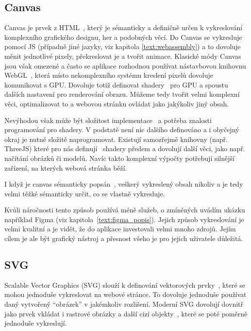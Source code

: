 \subsection{Canvas}

Canvas je prvek z HTML~\cite{canvashtml5, uzayr2022frontend}, který je sémanticky a definičně určen k vykreslování komplexního grafického designu, her a podobných věcí.
Do Canvas se vykresluje pomocí JS (případně jiné jazyky, viz kapitola \ref{text:webassembly}) a to dovoluje měnit jednotlivé pixely, překreslovat je a tvořit animace.
Klasické módy Canvas jsou však omezené a často se aplikace rozhodnou používat nástavbovou knihovnu WebGL~\cite{canvashtml5}, která místo nekomplexního systému kreslení pixelů dovoluje komunikovat s GPU.
Dovoluje totiž definovat shadery~\cite{canvashtml5} pro GPU a spoustu dalších nastavení pro renderování obrazu.
Můžeme tedy tvořit velmi komplexní věci, optimalizovat to a webovou stránku ovládat jako jakýkoliv jiný obsah. 

Nevýhodou však může být složitost implementace~\cite{canvashtml5} a potřeba znalosti programování pro shadery.
V podstatě není nic dalšího definováno a i obyčejný okraj je nutné složitě naprogramovat.
Existují samozřejmě knihovny (např. ThreeJS) které pro nás definují~\cite{canvashtml5} shadery předem a dovolují další věci, jako např. načítání obrázků či modelů.
Navíc takto komplexní výpočty potřebují silnější zařízení, na kterých webová stránka běží.

I když je canvas sémanticky popsán~\cite{canvashtml5}, veškerý vykreslený obsah nikoliv a je tedy velmi těžké sémanticky určit, co se vlastně vykresluje.

Kvůli náročnosti tento způsob používá méně služeb, o zmíněných uvádím ukázku například Figma (viz kapitola~\ref{text:figma_popis}).
Jejich způsob vykreslování je velmi kvalitní a je vidět, že do aplikace investovali velmi mnoho zdrojů.
Jejím cílem je ale být grafický nástroj a přesnost všeho je pro jejich uživatele důležitá.

\subsection{SVG}

Scalable Vector Graphics (SVG) slouží k definování vektorových prvky~\cite{svg_css_html}, které se mohou jednoduše vykreslovat na webové stránce.
To dovoluje jednoduše používat daný vytvořený \enquote{obrázek} v jakémkoliv rozlišení.
Moderní SVG dovolují dovnitř jako prvek vkládat i rastrové obrázky a další cizí objekty~\cite{svg_css_html, uzayr2022frontend}, které se poté poměrně jednoduše vykreslují.

